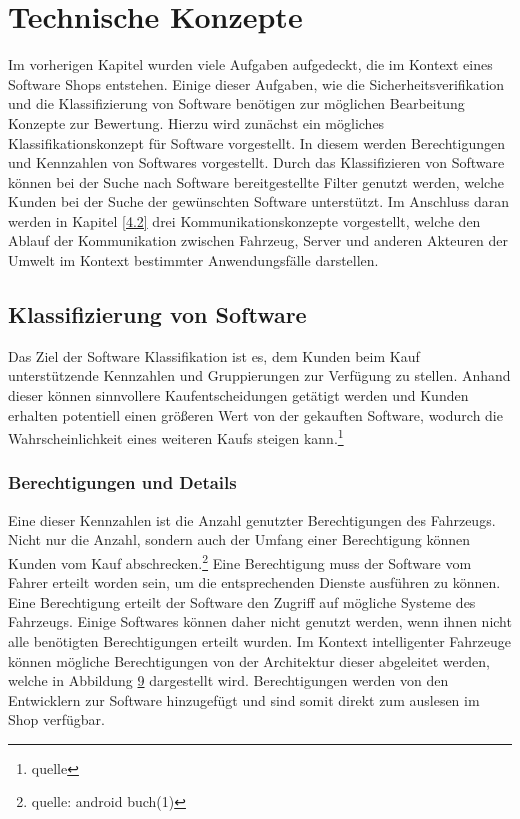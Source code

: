 \section{Technische Konzepte}\label{technische_konzepte}
Im vorherigen Kapitel wurden viele Aufgaben aufgedeckt, die im Kontext eines Software Shops entstehen. Einige dieser Aufgaben, wie die Sicherheitsverifikation und die Klassifizierung von Software benötigen zur möglichen Bearbeitung Konzepte zur Bewertung. Hierzu wird zunächst ein mögliches Klassifikationskonzept für Software vorgestellt. In diesem werden Berechtigungen und Kennzahlen von Softwares vorgestellt. Durch das Klassifizieren von Software können bei der Suche nach Software bereitgestellte Filter genutzt werden, welche Kunden bei der Suche der gewünschten Software unterstützt. Im Anschluss daran werden in Kapitel \ref{4.2} drei Kommunikationskonzepte vorgestellt, welche den Ablauf der Kommunikation zwischen Fahrzeug, Server und anderen Akteuren der Umwelt im Kontext bestimmter Anwendungsfälle darstellen.

\subsection{Klassifizierung von Software}\label{sw_klassifizierung}
Das Ziel der Software Klassifikation ist es, dem Kunden beim Kauf unterstützende Kennzahlen und Gruppierungen zur Verfügung zu stellen. Anhand dieser können sinnvollere Kaufentscheidungen getätigt werden und Kunden erhalten potentiell einen größeren Wert von der gekauften Software, wodurch die Wahrscheinlichkeit eines weiteren Kaufs steigen kann.\footnote{quelle}

\subsubsection{Berechtigungen und Details}
Eine dieser Kennzahlen ist die Anzahl genutzter Berechtigungen des Fahrzeugs. Nicht nur die Anzahl, sondern auch der Umfang einer Berechtigung können Kunden vom Kauf abschrecken.\footnote{quelle: android buch(1)} Eine Berechtigung muss der Software vom Fahrer erteilt worden sein, um die entsprechenden Dienste ausführen zu können. Eine Berechtigung erteilt der Software den Zugriff auf mögliche Systeme des Fahrzeugs. Einige Softwares können daher nicht genutzt werden, wenn ihnen nicht alle benötigten Berechtigungen erteilt wurden. Im Kontext intelligenter Fahrzeuge können mögliche Berechtigungen von der Architektur dieser abgeleitet werden, welche in Abbildung \hyperref[img:av_architecture]{9} dargestellt wird. Berechtigungen werden von den Entwicklern zur Software hinzugefügt und sind somit direkt zum auslesen im Shop verfügbar.

